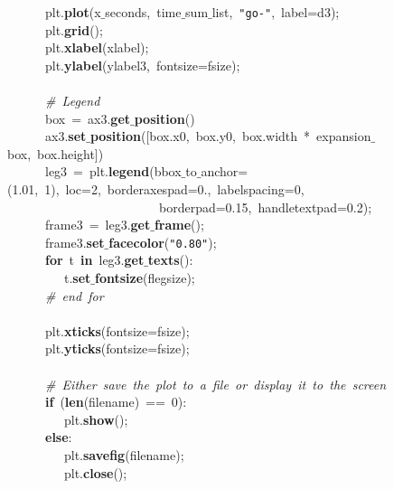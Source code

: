 \mbox{}\ \ \ \ \ \ plt.\textbf{plot}(x$\_$seconds,\ time$\_$sum$\_$list,\ \texttt{"{}go-"{}},\ label=d3); \\
\mbox{}\ \ \ \ \ \ plt.\textbf{grid}(); \\
\mbox{}\ \ \ \ \ \ plt.\textbf{xlabel}(xlabel); \\
\mbox{}\ \ \ \ \ \ plt.\textbf{ylabel}(ylabel3,\ fontsize=fsize); \\
\mbox{}\ \ \ \ \ \  \\
\mbox{}\ \ \ \ \ \ \textit{\#\ Legend} \\
\mbox{}\ \ \ \ \ \ box\ =\ ax3.\textbf{get$\_$position}() \\
\mbox{}\ \ \ \ \ \ ax3.\textbf{set$\_$position}([box.x0,\ box.y0,\ box.width\ *\ expansion$\_$box,\ box.height]) \\
\mbox{}\ \ \ \ \ \ leg3\ =\ plt.\textbf{legend}(bbox$\_$to$\_$anchor=(1.01,\ 1),\ loc=2,\ borderaxespad=0.,\ labelspacing=0,\  \\
\mbox{}\ \ \ \ \ \ \ \ \ \ \ \ \ \ \ \ \ \ \ \ \ \ \ \ borderpad=0.15,\ handletextpad=0.2); \\
\mbox{}\ \ \ \ \ \ frame3\ =\ leg3.\textbf{get$\_$frame}(); \\
\mbox{}\ \ \ \ \ \ frame3.\textbf{set$\_$facecolor}(\texttt{"{}0.80"{}}); \\
\mbox{}\ \ \ \ \ \ \textbf{for}\ t\ \textbf{in}\ leg3.\textbf{get$\_$texts}(): \\
\mbox{}\ \ \ \ \ \ \ \ \ t.\textbf{set$\_$fontsize}(flegsize); \\
\mbox{}\ \ \ \ \ \ \textit{\#\ end\ for} \\
\mbox{}\ \ \ \ \ \  \\
\mbox{}\ \ \ \ \ \ plt.\textbf{xticks}(fontsize=fsize); \\
\mbox{}\ \ \ \ \ \ plt.\textbf{yticks}(fontsize=fsize); \\
\mbox{}\ \ \ \ \ \  \\
\mbox{}\ \ \ \ \ \ \textit{\#\ Either\ save\ the\ plot\ to\ a\ file\ or\ display\ it\ to\ the\ screen} \\
\mbox{}\ \ \ \ \ \ \textbf{if}\ (\textbf{len}(filename)\ ==\ 0): \\
\mbox{}\ \ \ \ \ \ \ \ \ plt.\textbf{show}(); \\
\mbox{}\ \ \ \ \ \ \textbf{else}: \\
\mbox{}\ \ \ \ \ \ \ \ \ plt.\textbf{savefig}(filename); \\
\mbox{}\ \ \ \ \ \ \ \ \ plt.\textbf{close}(); \\
